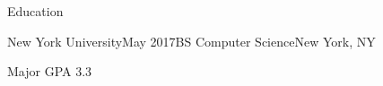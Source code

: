 \documentclass{resume} %
\begin{document}




\begin{rSection}{Education}

\begin{rSubsection}{New York University}{May 2017}{BS Computer Science}{New York, NY}
\item Major GPA 3.3
\end{rSubsection}

\end{rSection}
\end{document}
